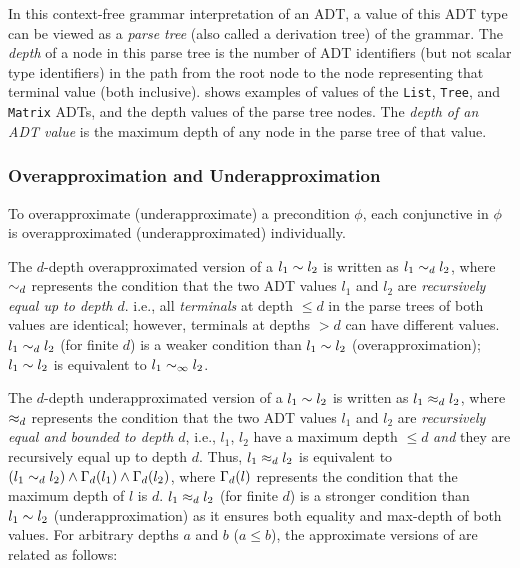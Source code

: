In this context-free grammar interpretation of an ADT, a value of this ADT type
can be viewed as a {\em parse tree} (also called a derivation tree) of the
grammar.
The {\em depth} of a node in this parse tree is the number
of ADT identifiers (but not scalar type identifiers) in the
path from the root node to the node representing that terminal value (both inclusive).
 shows examples of values of the {\tt List}, {\tt Tree},
and {\tt Matrix} ADTs, and the depth values of the parse tree nodes.
The {\em depth of an ADT value} is the maximum depth of any node
in the parse tree of that value.

\vspace{-6px}
\subsubsection{Overapproximation and Underapproximation}
To overapproximate (underapproximate)
a precondition $\phi$, each
conjunctive \recursiveRelation{} in $\phi$ is overapproximated (underapproximated)
individually.

The $d$-depth overapproximated
version of a \recursiveRelation{}
$l_1\sim{}l_2$ is written as $l_1\sim_d l_2$, where
$\sim_d$ represents the condition that the two ADT values
$l_1$ and $l_2$ are {\em recursively equal up to depth $d$}. i.e., all
{\em terminals} at depth $\leq d$ in the parse trees of both values
are identical; however, terminals at depths $>d$ can have
different values.
$l_1\sim_dl_2$ (for finite $d$) is a weaker
condition than $l_1\sim{}l_2$ (overapproximation);
$l_1\sim{}l_2$
is equivalent to
$l_1\sim_\infty l_2$.

The $d$-depth underapproximated
version of a \recursiveRelation{}
$l_1\sim{}l_2$ is written
as $l_1\approx_dl_2$, where $\approx_d$ represents
the condition that the two ADT values $l_1$ and $l_2$ are
{\em recursively equal and bounded to depth $d$}, i.e.,
$l_1$, $l_2$ have a maximum
depth $\leq d$ {\em and} they are recursively equal up to depth $d$.
Thus, $l_1\approx_dl_2$ is equivalent
to
$(l_1\sim_d l_2)\land\Gamma_d(l_1)\land\Gamma_d(l_2)$,
where $\Gamma_d(l)$ represents the condition that the maximum
depth of $l$ is $d$.
$l_1\approx_dl_2$ (for finite $d$)
is a stronger condition than $l_1\sim{}l_2$ (underapproximation)
as it ensures both equality and max-depth of both values.
For arbitrary depths $a$ and $b$ ($a \leq b$),
the approximate versions of \recursiveRelation{} are
related as follows:

